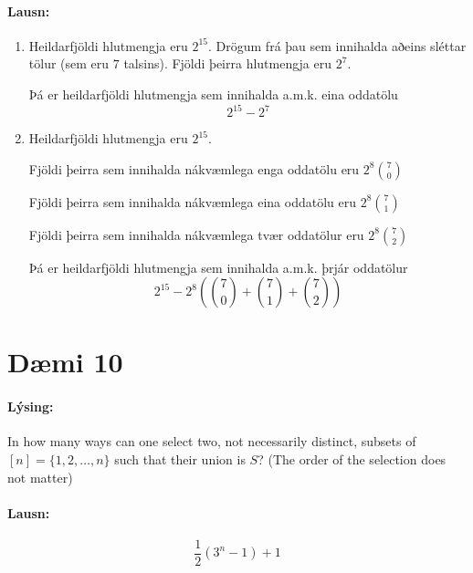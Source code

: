 \documentclass[a4paper,notitlepage]{article}
\theoremstyle{plain}
\theoremstyle{definition}
\begin{document}
\paragraph{Lausn:}
\begin{enumerate}
    \item Heildarfjöldi hlutmengja eru $2^{15}$. Drögum frá þau sem innihalda aðeins sléttar tölur (sem eru $7$ talsins). Fjöldi þeirra hlutmengja eru $2^7$.

        Þá er heildarfjöldi hlutmengja sem innihalda a.m.k. eina oddatölu
        \begin{equation*}
            2^{15}-2^7
        \end{equation*}

    \item Heildarfjöldi hlutmengja eru $2^{15}$.

        Fjöldi þeirra sem innihalda nákvæmlega enga oddatölu eru $2^8 \binom{7}{0}$

        Fjöldi þeirra sem innihalda nákvæmlega eina oddatölu eru $2^8 \binom{7}{1}$

        Fjöldi þeirra sem innihalda nákvæmlega tvær oddatölur eru $2^8 \binom{7}{2}$

        Þá er heildarfjöldi hlutmengja sem innihalda a.m.k. þrjár oddatölur
        \begin{equation*}
            2^{15} - 2^{8}\left( \binom{7}{0} + \binom{7}{1} + \binom{7}{2} \right)
        \end{equation*}
\end{enumerate}


\section*{Dæmi 10}
\paragraph{Lýsing:}
In how many ways can one select two, not necessarily distinct, subsets of $[n]=\{1,2,\dots,n\}$ such that their union is $S$? (The order of the selection does not matter)

\paragraph{Lausn:}
\begin{equation*}
    \frac{1}{2}(3^n-1)+1
\end{equation*}

\newpage
\end{document}

